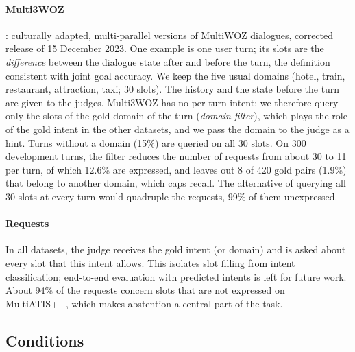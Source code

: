 \paragraph{Multi3WOZ} \citep{hu2023multi3woz}: culturally adapted, multi-parallel versions of MultiWOZ dialogues, corrected release of 15 December 2023. One example is one user turn; its slots are the \emph{difference} between the dialogue state after and before the turn, the definition consistent with joint goal accuracy. We keep the five usual domains (hotel, train, restaurant, attraction, taxi; 30 slots). The history and the state before the turn are given to the judges. Multi3WOZ has no per-turn intent; we therefore query only the slots of the gold domain of the turn (\emph{domain filter}), which plays the role of the gold intent in the other datasets, and we pass the domain to the judge as a hint. Turns without a domain (15\%) are queried on all 30 slots. On 300 development turns, the filter reduces the number of requests from about 30 to 11 per turn, of which 12.6\% are expressed, and leaves out 8 of 420 gold pairs (1.9\%) that belong to another domain, which caps recall. The alternative of querying all 30 slots at every turn would quadruple the requests, 99\% of them unexpressed.

\paragraph{Requests} In all datasets, the judge receives the gold intent (or domain) and is asked about every slot that this intent allows. This isolates slot filling from intent classification; end-to-end evaluation with predicted intents is left for future work. About 94\% of the requests concern slots that are not expressed on MultiATIS++, which makes abstention a central part of the task.

\subsection{Conditions}
\label{sec:conditions}

